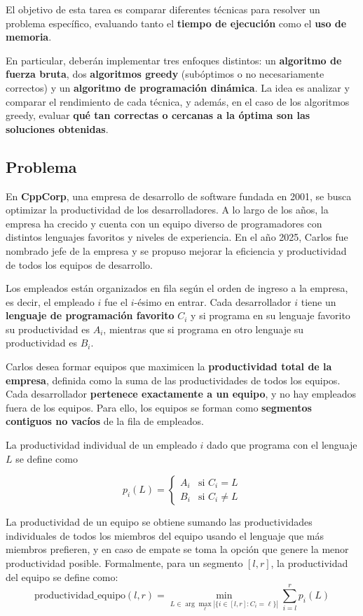 El objetivo de esta tarea \tnum es comparar diferentes técnicas para resolver un problema específico, evaluando tanto el \textbf{tiempo de ejecución} como el \textbf{uso de memoria}. 

En particular, deberán implementar tres enfoques distintos: un \textbf{algoritmo de fuerza bruta}, dos \textbf{algoritmos greedy} (subóptimos o no necesariamente correctos) y un \textbf{algoritmo de programación dinámica}. La idea es analizar y comparar el rendimiento de cada técnica, y además, en el caso de los algoritmos greedy, evaluar \textbf{qué tan correctas o cercanas a la óptima son las soluciones obtenidas}.

\subsection{Problema}

En \textbf{CppCorp}, una empresa de desarrollo de software fundada en 2001, se busca optimizar la productividad de los desarrolladores. A lo largo de los años, la empresa ha crecido y cuenta con un equipo diverso de programadores con distintos lenguajes favoritos y niveles de experiencia. En el año 2025, Carlos fue nombrado jefe de la empresa y se propuso mejorar la eficiencia y productividad de todos los equipos de desarrollo.

Los empleados están organizados en fila según el orden de ingreso a la empresa, es decir, el empleado $i$ fue el $i$-ésimo en entrar. Cada desarrollador $i$ tiene un \textbf{lenguaje de programación favorito} $C_i$ y si programa en su lenguaje favorito su productividad es $A_i$, mientras que si programa en otro lenguaje su productividad es $B_i$.

Carlos desea formar equipos que maximicen la \textbf{productividad total de la empresa}, definida como la suma de las productividades de todos los equipos. Cada desarrollador \textbf{pertenece exactamente a un equipo}, y no hay empleados fuera de los equipos. Para ello, los equipos se forman como \textbf{segmentos contiguos no vacíos} de la fila de empleados.

La productividad individual de un empleado $i$ dado que programa con el lenguaje $L$ se define como

\[
p_i(L) =
\begin{cases}
A_i & \text{si } C_i = L \\
B_i & \text{si } C_i \neq L
\end{cases}
\]

La productividad de un equipo se obtiene sumando las productividades individuales de todos los miembros del equipo usando el lenguaje que más miembros prefieren, y en caso de empate se toma la opción que genere la menor productividad posible. Formalmente, para un segmento $[l,r]$, la productividad del equipo se define como:
\[
\text{productividad\_equipo}(l,r) = \min_{L \in \arg\max_\ell |\{ i \in [l,r] : C_i = \ell \}|} \sum_{i=l}^{r} p_i(L)
\]

